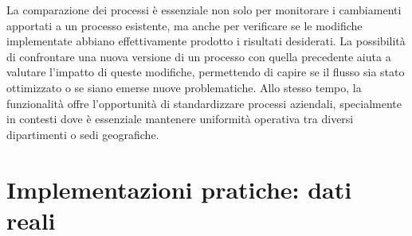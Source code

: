 \documentclass{article}
\begin{document}
La comparazione dei processi è essenziale non solo per monitorare i cambiamenti apportati a un processo esistente, ma anche per verificare se le modifiche implementate abbiano effettivamente prodotto i risultati desiderati. La possibilità di confrontare una nuova versione di un processo con quella precedente aiuta a valutare l'impatto di queste modifiche, permettendo di capire se il flusso sia stato ottimizzato o se siano emerse nuove problematiche. Allo stesso tempo, la funzionalità offre l’opportunità di standardizzare processi aziendali, specialmente in contesti dove è essenziale mantenere uniformità operativa tra diversi dipartimenti o sedi geografiche.\\

\section{Implementazioni pratiche: dati reali}
\end{document}
